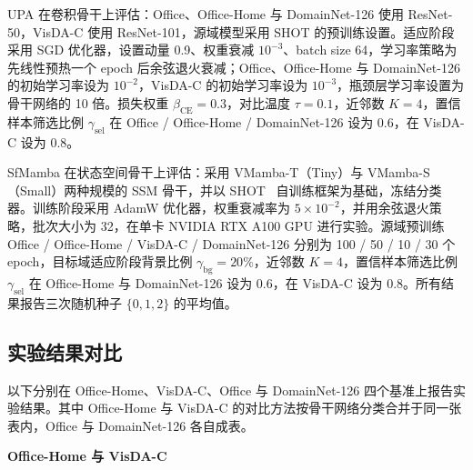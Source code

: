 UPA 在卷积骨干上评估：Office、Office-Home 与 DomainNet-126 使用 ResNet-50，VisDA-C 使用 ResNet-101，源域模型采用 SHOT 的预训练设置。适应阶段采用 SGD 优化器，设置动量 0.9、权重衰减 $10^{-3}$、batch size 64，学习率策略为先线性预热一个 epoch 后余弦退火衰减；Office、Office-Home 与 DomainNet-126 的初始学习率设为 $10^{-2}$，VisDA-C 的初始学习率设为 $10^{-3}$，瓶颈层学习率设置为骨干网络的 10 倍。损失权重 $\beta_{\text{CE}} = 0.3$，对比温度 $\tau = 0.1$，近邻数 $K = 4$，置信样本筛选比例 $\gamma_{\text{sel}}$ 在 Office / Office-Home / DomainNet-126 设为 0.6，在 VisDA-C 设为 0.8。

SfMamba 在状态空间骨干上评估：采用 VMamba-T（Tiny）与 VMamba-S（Small）两种规模的 SSM 骨干，并以 SHOT~\cite{liang2021source} 自训练框架为基础，冻结分类器。训练阶段采用 AdamW 优化器，权重衰减率为 $5 \times 10^{-2}$，并用余弦退火策略，批次大小为 32，在单卡 NVIDIA RTX A100 GPU 进行实验。源域预训练 Office / Office-Home / VisDA-C / DomainNet-126 分别为 100 / 50 / 10 / 30 个 epoch，目标域适应阶段背景比例 $\gamma_{\text{bg}} = 20\%$，近邻数 $K = 4$，置信样本筛选比例 $\gamma_{\text{sel}}$ 在 Office-Home 与 DomainNet-126 设为 0.6，在 VisDA-C 设为 0.8。所有结果报告三次随机种子 $\{0, 1, 2\}$ 的平均值。


\subsection{实验结果对比}

以下分别在 Office-Home、VisDA-C、Office 与 DomainNet-126 四个基准上报告实验结果。其中 Office-Home 与 VisDA-C 的对比方法按骨干网络分类合并于同一张表内，Office 与 DomainNet-126 各自成表。

\noindent\textbf{Office-Home 与 VisDA-C}

